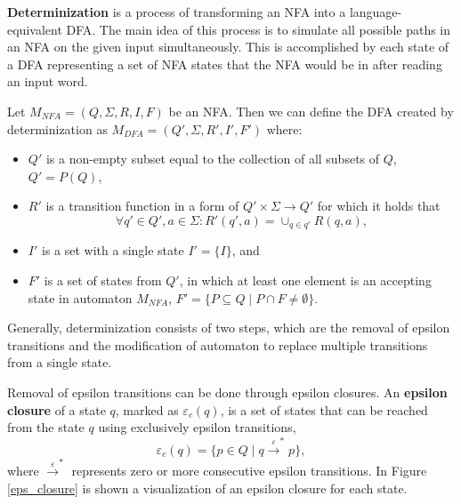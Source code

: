 \textbf{Determinization} is a process of transforming an NFA into a language-equivalent DFA. The main idea of this process is to simulate all possible paths in an NFA on the given input simultaneously. This is accomplished by each state of a DFA representing a set of NFA states that the NFA would be in after reading an input word.

Let $M_{NFA}=(Q,\Sigma,R,I,F)$ be an NFA. Then we can define the DFA created by determinization as $M_{DFA}=(Q', \Sigma, R', I', F')$ where:

\begin{itemize}
    \item $Q'$ is a non-empty subset equal to the collection of all subsets of $Q$,  $Q'=P(Q)$,
    \item $R'$ is a transition function in a form of $Q'\times \Sigma \rightarrow Q'$ for which it holds that
    \begin{equation*}
        \forall q' \in Q', a \in \Sigma : R'(q',a) = \cup_{q \in q'} R(q,a),
    \end{equation*}
    \item $I'$ is a set with a single state $I'=\{I\}$, and
    \item $F'$ is a set of states from $Q'$, in which at least one element is an accepting state in automaton $M_{NFA}$, $F' =\{P \subseteq Q \mid P \cap F \neq \emptyset\}$.
\end{itemize}

Generally, determinization consists of two steps, which are the removal of epsilon transitions and the modification of automaton to replace multiple transitions from a single state.
\vspace{2.5mm}

Removal of epsilon transitions can be done through epsilon closures. An \textbf{epsilon \mbox{closure}} of a state $q$, marked as  $\varepsilon_{c}(q)$, is a set of states that can be reached from the state $q$ using exclusively epsilon transitions,
\begin{equation*}
    \varepsilon_{c}(q) = \{p \in Q \mid q \xrightarrow{\varepsilon}^{*} p \},
\end{equation*}
where $\xrightarrow{\varepsilon}^{*}$ represents zero or more consecutive epsilon transitions. In Figure \ref{eps_closure} is shown a visualization of an epsilon closure for each state.

